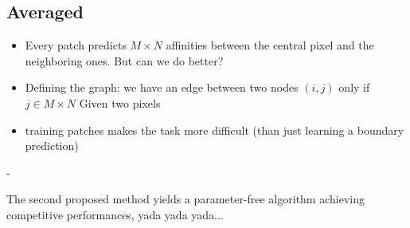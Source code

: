 \subsection{Averaged }\label{sec:prob_affs}
\begin{itemize}
\item Every patch predicts $M\times N$ affinities between the central pixel and the neighboring ones. But can we do better?
\item Defining the graph: we have an edge between two nodes $(i, j)$ only if $j \in M\times N$ Given two pixels  
\item training patches makes the task more difficult (than just learning a boundary prediction)
\end{itemize}
- 


The second proposed method yields a parameter-free algorithm achieving competitive performances, yada yada yada... 



